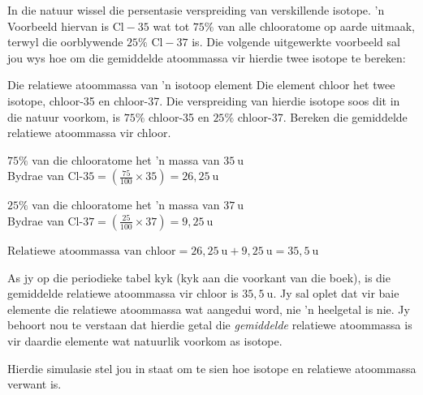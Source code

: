 In die natuur wissel die persentasie verspreiding van verskillende isotope.   'n Voorbeeld hiervan is $\text{Cl}-35$ wat tot $75\%$ van alle chlooratome op aarde uitmaak, terwyl die oorblywende $25\%$ $\text{Cl}-37$ is. Die volgende uitgewerkte voorbeeld sal jou wys
hoe om die gemiddelde atoommassa vir hierdie twee isotope te bereken: \par  
\begin{wex}{Die relatiewe atoommassa van  'n isotoop element}{
Die element chloor het twee isotope, chloor-35 en chloor-37. Die verspreiding van hierdie isotope soos dit in die natuur voorkom, is $75\%$ chloor-35 en $25\%$ chloor-37. Bereken die gemiddelde relatiewe atoommassa vir chloor.
}
{
$75\%$ van die chlooratome het  'n massa van $35~\text{u}$ \\
Bydrae van $\text{Cl-}35 = (\frac{75}{100} \times 35) = 26,25~\text{u}$

$25\%$ van die chlooratome het  'n massa van $37~\text{u}$ \\ 
Bydrae van $\text{Cl-}37 = (\frac{25}{100} \times 37) = 9,25~\text{u}$


$\text{Relatiewe atoommassa van chloor} = 26,25~\text{u} + 9,25~\text{u} = 35,5~\text{u}$ \\
}
\end{wex}
As jy op die periodieke tabel kyk (kyk aan die voorkant van die boek), is die gemiddelde relatiewe atoommassa vir chloor is $35,5~\text{u}$. Jy sal oplet dat vir baie elemente die relatiewe atoommassa wat aangedui word, nie  'n heelgetal is nie. Jy behoort nou te verstaan ​dat hierdie getal die \textsl{gemiddelde} relatiewe atoommassa is vir daardie elemente wat natuurlik voorkom as isotope.\par

Hierdie simulasie stel jou in staat om te sien hoe isotope en relatiewe atoommassa verwant is.



